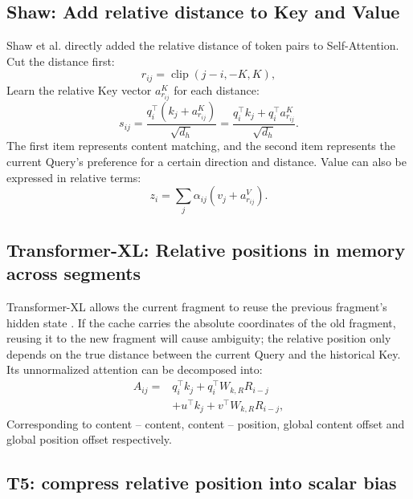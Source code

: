 \documentclass[UTF8,fontset=none,a4paper,10pt]{ctexart}
\begin{document}
\subsection{Shaw: Add relative distance to Key and Value}

Shaw et al. directly added the relative distance of token pairs to Self-Attention\cite{shaw2018}. Cut the distance first:
\begin{equation}
  r_{ij}=\operatorname{clip}(j-i,-K,K),
  \label{eq:clip}
\end{equation}
Learn the relative Key vector $a^K_{r_{ij}}$ for each distance:
\begin{equation}
  s_{ij}=\frac{q_i^\top(k_j+a^K_{r_{ij}})}{\sqrt{d_h}}
  =\frac{q_i^\top k_j+q_i^\top a^K_{r_{ij}}}{\sqrt{d_h}}.
  \label{eq:shaw-score}
\end{equation}
The first item represents content matching, and the second item represents the current Query's preference for a certain direction and distance. Value can also be expressed in relative terms:
\begin{equation}
  z_i=\sum_j\alpha_{ij}(v_j+a^V_{r_{ij}}).
  \label{eq:shaw-value}
\end{equation}

\subsection{Transformer-XL: Relative positions in memory across segments}

Transformer-XL allows the current fragment to reuse the previous fragment's hidden state \cite{dai2019}. If the cache carries the absolute coordinates of the old fragment, reusing it to the new fragment will cause ambiguity; the relative position only depends on the true distance between the current Query and the historical Key. Its unnormalized attention can be decomposed into:
\begin{equation}
  \begin{aligned}
  A_{ij}={}&q_i^\top k_j+q_i^\top W_{k,R}R_{i-j}\\
           &+u^\top k_j+v^\top W_{k,R}R_{i-j},
  \end{aligned}
  \label{eq:txl}
\end{equation}
Corresponding to content -- content, content -- position, global content offset and global position offset respectively.

\subsection{T5: compress relative position into scalar bias}
\end{document}
